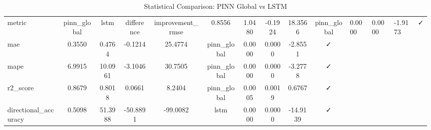 \begin{table}[htbp]
\caption{Statistical Comparison: PINN Global vs LSTM}
\label{tab:pinn_lstm_comparison}
\begin{tabular}{lccccccccc}
\toprule
metric & pinn_global & lstm & difference & improvement_%
\midrule
rmse & 0.8556 & 1.0480 & -0.1924 & 18.3566 & pinn_global & 0.0000 & 0.0000 & -1.9173 & ✓ \\
mae & 0.3550 & 0.4764 & -0.1214 & 25.4774 & pinn_global & 0.0000 & 0.0000 & -2.8551 & ✓ \\
mape & 6.9915 & 10.0961 & -3.1046 & 30.7505 & pinn_global & 0.0000 & 0.0000 & -3.2778 & ✓ \\
r2_score & 0.8679 & 0.8018 & 0.0661 & 8.2404 & pinn_global & 0.0005 & 0.0019 & 0.6767 & ✓ \\
directional_accuracy & 0.5098 & 51.3988 & -50.8891 & -99.0082 & lstm & 0.0000 & 0.0000 & -14.9139 & ✓ \\
\bottomrule
\end{tabular}
\end{table}

